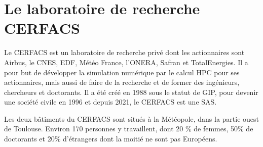 \chapter{Le laboratoire de recherche CERFACS}





Le CERFACS est un laboratoire de recherche privé dont les actionnaires sont\label{actionnaires} Airbus, le \ac{CNES}, \ac{EDF}, Météo France, l'\ac{ONERA}, Safran et TotalEnergies. Il a pour but de développer la simulation numérique par le calcul HPC pour ses actionnaires, mais aussi de faire de la recherche et de former des ingénieurs, chercheurs et doctorants. Il a été créé en 1988 sous le statut de \ac{GIP}, pour devenir une société civile en 1996 et depuis 2021, le CERFACS est une \ac{SAS}.

\vspace{0,5cm}

Les deux bâtiments du CERFACS sont situés à la Météopole, dans la partie ouest de Toulouse. Environ 170 personnes y travaillent, dont 20 \% de femmes, 50\% de doctorants et 20\% d'étrangers dont la moitié ne sont pas Européens.

